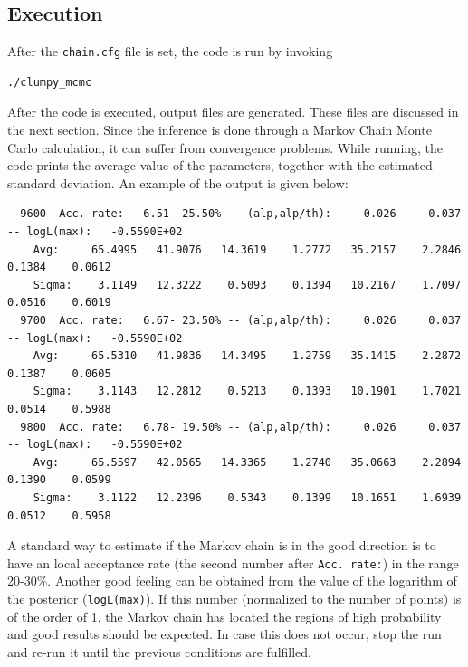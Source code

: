 \documentclass[12pt]{article}
\begin{document}
\subsection{Execution}
\label{sec:execution}
After the \texttt{chain.cfg} file is set, the code is run by invoking
\begin{verbatim}
./clumpy_mcmc
\end{verbatim}
After the code is executed, output files are generated. These files are discussed in the
next section. Since the inference is done through a Markov Chain Monte Carlo calculation,
it can suffer from convergence problems. While running, the code prints the average value
of the parameters, together with the estimated standard deviation. An example of the
output is given below:
\begin{scriptsize}
\begin{verbatim}
  9600  Acc. rate:   6.51- 25.50% -- (alp,alp/th):     0.026     0.037 -- logL(max):   -0.5590E+02    
    Avg:     65.4995   41.9076   14.3619    1.2772   35.2157    2.2846    0.1384    0.0612            
    Sigma:    3.1149   12.3222    0.5093    0.1394   10.2167    1.7097    0.0516    0.6019            
  9700  Acc. rate:   6.67- 23.50% -- (alp,alp/th):     0.026     0.037 -- logL(max):   -0.5590E+02    
    Avg:     65.5310   41.9836   14.3495    1.2759   35.1415    2.2872    0.1387    0.0605            
    Sigma:    3.1143   12.2812    0.5213    0.1393   10.1901    1.7021    0.0514    0.5988            
  9800  Acc. rate:   6.78- 19.50% -- (alp,alp/th):     0.026     0.037 -- logL(max):   -0.5590E+02    
    Avg:     65.5597   42.0565   14.3365    1.2740   35.0663    2.2894    0.1390    0.0599            
    Sigma:    3.1122   12.2396    0.5343    0.1399   10.1651    1.6939    0.0512    0.5958
\end{verbatim}
\end{scriptsize}
A standard way to estimate if the Markov chain is in the good direction is to have
an local acceptance rate (the second number after \texttt{Acc. rate:}) in the range 20-30\%.
Another good feeling can be obtained from the value of the logarithm of the posterior (\texttt{logL(max)}).
If this number (normalized to the number of points) is of the order of 1, the Markov chain has
located the regions of high probability and good results should be expected. In case this does
not occur, stop the run and re-run it until the previous conditions are fulfilled.
\end{document}
